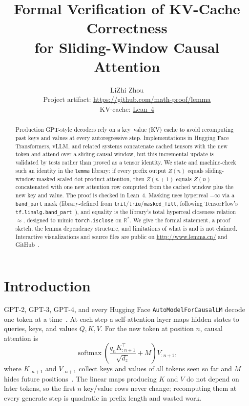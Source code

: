 \documentclass[11pt,a4paper]{article}
\title{Formal Verification of KV-Cache Correctness\\for Sliding-Window Causal Attention}
\author{LiZhi Zhou\\[0.3em]
\small Project artifact: \url{https://github.com/math-proof/lemma}\\[0.2em]
\small KV-cache:
\href{http://www.lemma.cn/lean/?module=Tensor.GetSlice.eq.Append_DotSoftmaxDivDot_Append.of.All_Eq_DotSoftmaxAdd_DivDot_T}{Lean~4}}
\date{}
\newcommand{\XEq}{\approx}
\newcommand{\Rstar}{\mathbb{R}^*}
\begin{document}
\maketitle

\begin{abstract}
Production GPT-style decoders rely on a key--value (KV) cache to avoid recomputing past keys and values at every autoregressive step.
Implementations in Hugging Face Transformers, vLLM, and related systems concatenate cached tensors with the new token and attend over a sliding causal window, but this incremental update is validated by tests rather than proved as a tensor identity.
We state and machine-check such an identity in the \texttt{lemma} library: if every prefix output $Z(n)$ equals sliding-window masked scaled dot-product attention, then $Z(n{+}1)$ equals $Z(n)$ concatenated with one new attention row computed from the cached window plus the new key and value.
The proof is checked in Lean~4.
Masking uses hyperreal $-\infty$ via a \texttt{band\_part} mask (library-defined from \texttt{tril}/\texttt{triu}/\texttt{masked\_fill}, following TensorFlow's \texttt{tf.linalg.band\_part}~\cite{tensorflow_band_part}), and equality is the library's total hyperreal closeness relation $\XEq$, designed to mimic \texttt{torch.isclose} on $\Rstar$.
We give the formal statement, a proof sketch, the lemma dependency structure, and limitations of what is and is not claimed.
Interactive visualizations and source files are public on \url{http://www.lemma.cn/} and GitHub~\cite{lemma_repo}.
\end{abstract}

\section{Introduction}
\label{sec:intro}

GPT-2, GPT-3, GPT-4, and every Hugging Face \texttt{AutoModelForCausalLM} decode one token at a time~\cite{radford2019language}.
At each step a self-attention layer maps hidden states to queries, keys, and values $Q,K,V$.
For the new token at position $n$, causal attention is
\[
\operatorname{softmax}\!\left(\frac{q_n K_{:n+1}^{\top}}{\sqrt{d_z}}+M\right)V_{:n+1},
\]
where $K_{:n+1}$ and $V_{:n+1}$ collect keys and values of all tokens seen so far and $M$ hides future positions~\cite{vaswani2017attention}.
The linear maps producing $K$ and $V$ do not depend on later tokens, so the first $n$ key/value rows never change; recomputing them at every generate step is quadratic in prefix length and wasted work.
\end{document}
